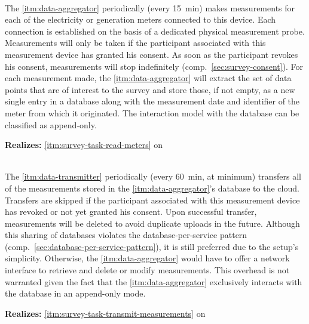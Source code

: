 \begin{description}[format={\storedescriptionlabel}]
  \item[Data Aggregator\label{itm:data-aggregator}]
  \hfill \\
  The \ref{itm:data-aggregator} periodically (every \SI{15}{\minute}) makes measurements for each of the electricity or generation meters connected to this device. Each connection is established on the basis of a dedicated physical measurement probe. Measurements will only be taken if the participant associated with this measurement device has granted his consent. As soon as the participant revokes his consent, measurements will stop indefinitely (comp.~\autoref{sec:survey-consent}). For each measurement made, the \ref{itm:data-aggregator} will extract the set of data points that are of interest to the survey and store those, if not empty, as a new single entry in a database along with the measurement date and identifier of the meter from which it originated. The interaction model with the database can be classified as append-only.

  \textbf{Realizes:} \ref{itm:survey-task-read-meters} on 

  \item[Data Transmitter\label{itm:data-transmitter}]
  \hfill \\
  The \ref{itm:data-transmitter} periodically (every \SI{60}{\minute}, at minimum) transfers all of the measurements stored in the \ref{itm:data-aggregator}'s database to the cloud. Transfers are skipped if the participant associated with this measurement device has revoked or not yet granted his consent. Upon successful transfer, measurements will be deleted to avoid duplicate uploads in the future. Although this sharing of databases violates the database-per-service pattern (comp.~\autoref{sec:database-per-service-pattern}), it is still preferred due to the setup's simplicity. Otherwise, the \ref{itm:data-aggregator} would have to offer a network interface to retrieve and delete or modify measurements. This overhead is not warranted given the fact that the \ref{itm:data-aggregator} exclusively interacts with the database in an append-only mode.

  \textbf{Realizes:} \ref{itm:survey-task-transmit-measurements} on 


\end{description}
